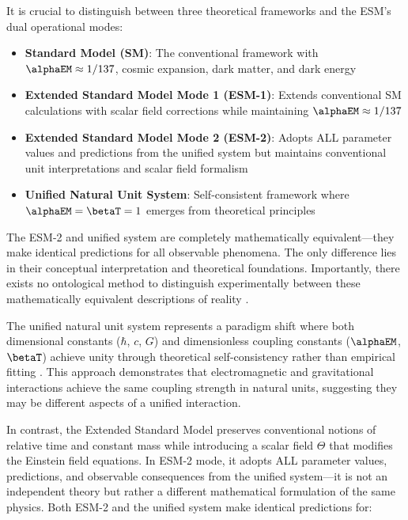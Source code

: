 	It is crucial to distinguish between three theoretical frameworks and the ESM's dual operational modes:
	
	\begin{itemize}
		\item \textbf{Standard Model (SM)}: The conventional framework with $\alphaEM \approx 1/137$, cosmic expansion, dark matter, and dark energy \cite{Weinberg1989,PDG2020}
		\item \textbf{Extended Standard Model Mode 1 (ESM-1)}: Extends conventional SM calculations with scalar field corrections while maintaining $\alphaEM \approx 1/137$
		\item \textbf{Extended Standard Model Mode 2 (ESM-2)}: Adopts ALL parameter values and predictions from the unified system but maintains conventional unit interpretations and scalar field formalism
		\item \textbf{Unified Natural Unit System}: Self-consistent framework where $\alphaEM = \betaT = 1$ emerges from theoretical principles \cite{pascher_unified_2025}
	\end{itemize}
	
	The ESM-2 and unified system are completely mathematically equivalent—they make identical predictions for all observable phenomena. The only difference lies in their conceptual interpretation and theoretical foundations. Importantly, there exists no ontological method to distinguish experimentally between these mathematically equivalent descriptions of reality \cite{Duhem1906,Quine1951}.
	
	The unified natural unit system represents a paradigm shift where both dimensional constants ($\hbar$, $c$, $G$) and dimensionless coupling constants ($\alphaEM$, $\betaT$) achieve unity through theoretical self-consistency rather than empirical fitting \cite{pascher_beta_derivation_2025}. This approach demonstrates that electromagnetic and gravitational interactions achieve the same coupling strength in natural units, suggesting they may be different aspects of a unified interaction.
	
	In contrast, the Extended Standard Model preserves conventional notions of relative time and constant mass while introducing a scalar field $\Theta$ that modifies the Einstein field equations. In ESM-2 mode, it adopts ALL parameter values, predictions, and observable consequences from the unified system—it is not an independent theory but rather a different mathematical formulation of the same physics. Both ESM-2 and the unified system make identical predictions for:
	
